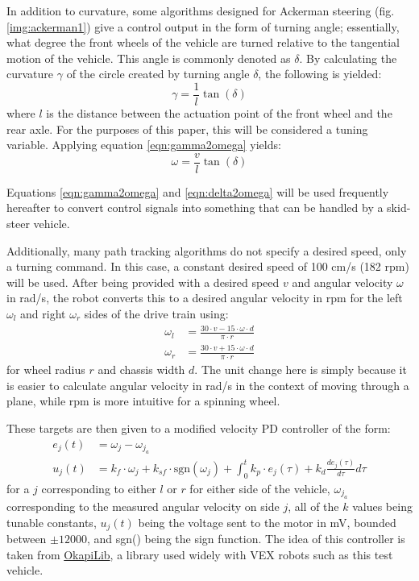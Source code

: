 \documentclass[mla8alt]{mla}
\begin{document}
\begin{paper}
In addition to curvature, some algorithms designed for Ackerman steering (fig. \ref{img:ackerman1}) give a control output in the form of turning angle; essentially, what degree the front wheels of the vehicle are turned relative to the tangential motion of the vehicle. This angle is commonly denoted as $\delta$. By calculating the curvature $\gamma$ of the circle created by turning angle $\delta$, the following is yielded:
\begin{equation}
\gamma = \frac{1}{l}\tan{(\delta)}
\end{equation}
where $l$ is the distance between the actuation point of the front wheel and the rear axle. For the purposes of this paper, this will be considered a tuning variable. Applying equation \ref{eqn:gamma2omega} yields:
\begin{equation}
\omega = \frac{v}{l}\tan{(\delta)} \label{eqn:delta2omega}
\end{equation}

Equations \ref{eqn:gamma2omega} and \ref{eqn:delta2omega} will be used frequently hereafter to convert control signals into something that can be handled by a skid-steer vehicle. 

Additionally, many path tracking algorithms do not specify a desired speed, only a turning command. In this case, a constant desired speed of 100 cm/s (182 rpm) will be used. After being provided with a desired speed $v$ and angular velocity $\omega$ in rad/s, the robot converts this to a desired angular velocity in rpm for the left $\omega_l$ and right $\omega_r$ sides of the drive train using:
\begin{subequations}
\begin{align}
\omega_l&= \frac{30 \cdot v - 15 \cdot \omega \cdot d}{\pi \cdot r} \\
\omega_r&= \frac{30 \cdot v + 15 \cdot \omega \cdot d}{\pi \cdot r}
\end{align}
\end{subequations}
for wheel radius $r$ and chassis width $d$. The unit change here is simply because it is easier to calculate angular velocity in rad/s in the context of moving through a plane, while rpm is more intuitive for a spinning wheel.

These targets are then given to a modified velocity PD controller of the form:
\begin{subequations}
\begin{align}
e_j(t) &= \omega_j - \omega_{j_a} \\
u_j(t) &= k_f \cdot \omega_j + k_{sf} \cdot \text{sgn}(\omega_j) + \int_0^t \! k_p \cdot e_j(\tau) + k_d \frac{de_j(\tau)}{d\tau} d\tau
\end{align}
\end{subequations}
for a $j$ corresponding to either $l$ or $r$ for either side of the vehicle, $\omega_{j_a}$ corresponding to the measured angular velocity on side $j$, all of the $k$ values being tunable constants, $u_j(t)$ being the voltage sent to the motor in mV, bounded between $\pm12000$, and sgn() being the sign function. The idea of this controller is taken from \href{https://github.com/OkapiLib/OkapiLib}{OkapiLib}, a library used widely with VEX robots such as this test vehicle. 


\end{paper}
\end{document}
